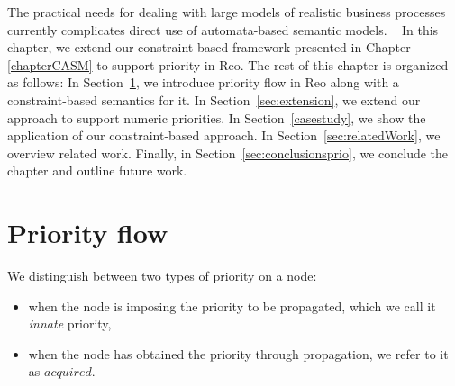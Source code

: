 The practical needs for dealing with large models of realistic business processes currently complicates direct use of automata-based semantic models. 
In this chapter, we extend our constraint-based framework presented in Chapter \ref{chapterCASM} to support priority in Reo.
 The rest of this chapter is organized as follows: In Section~\ref{sec:example}, we introduce priority flow in Reo along with a constraint-based semantics for it. In Section~\ref{sec:extension}, we extend our approach to support numeric priorities. In Section~\ref{casestudy}, we show the application of our constraint-based approach. %
 In Section~\ref{sec:relatedWork}, we overview related work. Finally, in Section~\ref{sec:conclusionsprio}, we conclude the chapter and outline future work.

\section{Priority flow}
\label{sec:example}
We distinguish between two types of priority on a node:

\begin{itemize}
\item
 when the node is imposing the priority to be propagated, which we call it \emph{innate} priority, 
\item when the node has obtained the priority through propagation, we refer to it as $acquired$. 
\end{itemize}

